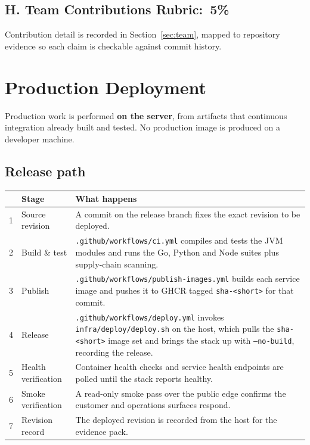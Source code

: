 \documentclass[11pt,a4paper]{article}
\newcommand{\pth}[1]{\texttt{\small #1}}
\newcommand{\rubric}[1]{{\small\textcolor{finixteal}{\textbf{Rubric:}~#1}}}
\begin{document}
\subsection{H. Team Contributions \hfill \rubric{5\%}}

Contribution detail is recorded in Section~\ref{sec:team}, mapped to repository evidence so each
claim is checkable against commit history.

\section{Production Deployment}

Production work is performed \textbf{on the server}, from artifacts that continuous integration
already built and tested. No production image is produced on a developer machine.

\subsection{Release path}

\begin{center}
\begin{tabularx}{\textwidth}{@{}p{4mm}lX@{}}
\toprule
& \textbf{Stage} & \textbf{What happens}\\
\midrule
1 & Source revision & A commit on the release branch fixes the exact revision to be deployed.\\
2 & Build \& test & \pth{.github/workflows/ci.yml} compiles and tests the JVM modules and runs the Go, Python and Node suites plus supply-chain scanning.\\
3 & Publish & \pth{.github/workflows/publish-images.yml} builds each service image and pushes it to GHCR tagged \pth{sha-<short>} for that commit.\\
4 & Release & \pth{.github/workflows/deploy.yml} invokes \pth{infra/deploy/deploy.sh} on the host, which pulls the \pth{sha-<short>} image set and brings the stack up with \pth{--no-build}, recording the release.\\
5 & Health verification & Container health checks and service health endpoints are polled until the stack reports healthy.\\
6 & Smoke verification & A read-only smoke pass over the public edge confirms the customer and operations surfaces respond.\\
7 & Revision record & The deployed revision is recorded from the host for the evidence pack.\\
\bottomrule
\end{tabularx}
\end{center}
\end{document}
